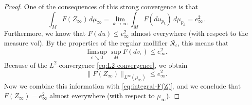 \documentclass[a4paper]{article}
\newcommand{\vol}{\mathrm{vol}}
\theoremstyle{definition}
\theoremstyle{remark}
\begin{document}
\begin{proof}
One of the consequences of this strong convergence is that
\begin{equation} \label{eq:integral-F(Z)}
\int_M F(Z_\infty) \, d\mu_\infty = \lim_{k \to \infty} \int_M F(du_{p_k}) \, d\mu_{p_k} = e_\infty^2.
\end{equation}
Furthermore, we know that $F(du) \le e_\infty^2$ almost everywhere (with respect to the measure $\vol$). By the properties of the regular mollifier $\mathcal{R}_\epsilon$, this means that
\[
\limsup_{\epsilon \searrow 0} \sup_M F(dv_\epsilon) \le e_\infty^2.
\]
Because of the $L^2$-convergence \eqref{eq:L2-convergence}, we obtain
\[
\|F(Z_\infty)\|_{L^\infty(\mu_\infty)} \le e_\infty^2.
\]
Now we combine this information with \eqref{eq:integral-F(Z)}, and we conclude that $F(Z_\infty) = e_\infty^2$ almost everywhere (with respect to $\mu_\infty$).
\end{proof}
\end{document}
